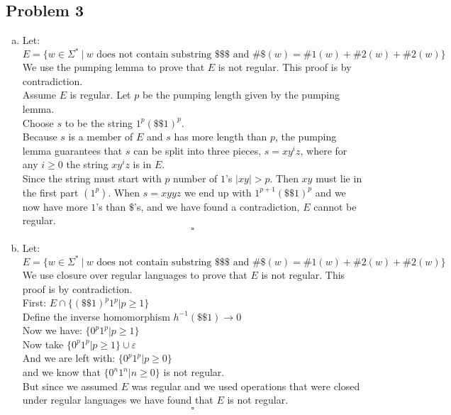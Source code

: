 \documentclass{article}
\begin{document}
\subsection*{Problem 3}
\begin{enumerate}[a)]
        \item Let:
    \[ E = \{ w \in \Sigma^* ~|~ \text{$w$ does not contain substring $\$\$\$ $ and } \#\$(w) = \#1(w) + \#2(w) + \#2(w) \} \]
    We use the pumping lemma to prove that $E$ is not regular.
    This proof is by contradiction.\\
    Assume $E$ is regular. Let $p$ be the pumping length given by the pumping lemma. \\
    Choose $s$ to be the string $1^p(\$\$1)^p$. \\
    Because $s$ is a member of $E$ and $s$ has more length than $p$,
    the pumping lemma guarantees that $s$ can be split into three pieces,
    $s = xy^iz$, where for any $i \geq 0$ the string $xy^iz$ is in $E$. \\
    Since the string must start with $p$ number of $1$'s $|xy| > p$. Then $xy$ must lie in
    the first part $(1^p)$. When $s = xyyz$ we end up with $1^{p+1}(\$\$1)^p$ and we now
    have more $1$'s than $\$$'s, and
    we have found a contradiction, $E$ cannot be regular.
    \[ \square \]

    \item Let: \\
    \[ E = \{ w \in \Sigma^* ~|~ \text{$w$ does not contain substring $\$\$\$ $ and } \#\$(w) = \#1(w) + \#2(w) + \#2(w) \} \]
    We use closure over regular languages to prove that $E$ is not regular.
    This proof is by contradiction.\\
    First: $ E \cap \{ (\$\$1)^p1^p | p \geq 1 \} $ \\
    Define the inverse homomorphism $h^{-1}(\$\$1) \rightarrow 0$ \\
    Now we have: $\{0^p1^p | p \geq 1 \}$ \\
    Now take $\{ 0^p1^p | p \geq 1 \} \cup \varepsilon $ \\
    And we are left with: $\{ 0^p1^p | p \geq 0 \} $ \\
    and we know that $ \{ 0^n1^n | n \geq 0\} $ is not regular. \\
    But since we assumed $E$ was regular and we used operations that were closed
    under regular languages we have found that $E$ is not regular.
    \[ \square \]

\end{enumerate}
\end{document}
